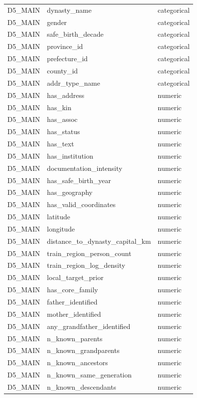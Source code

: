 \begin{longtable}{lll}
D5\_MAIN & dynasty\_name & categorical \\
D5\_MAIN & gender & categorical \\
D5\_MAIN & safe\_birth\_decade & categorical \\
D5\_MAIN & province\_id & categorical \\
D5\_MAIN & prefecture\_id & categorical \\
D5\_MAIN & county\_id & categorical \\
D5\_MAIN & addr\_type\_name & categorical \\
D5\_MAIN & has\_address & numeric \\
D5\_MAIN & has\_kin & numeric \\
D5\_MAIN & has\_assoc & numeric \\
D5\_MAIN & has\_status & numeric \\
D5\_MAIN & has\_text & numeric \\
D5\_MAIN & has\_institution & numeric \\
D5\_MAIN & documentation\_intensity & numeric \\
D5\_MAIN & has\_safe\_birth\_year & numeric \\
D5\_MAIN & has\_geography & numeric \\
D5\_MAIN & has\_valid\_coordinates & numeric \\
D5\_MAIN & latitude & numeric \\
D5\_MAIN & longitude & numeric \\
D5\_MAIN & distance\_to\_dynasty\_capital\_km & numeric \\
D5\_MAIN & train\_region\_person\_count & numeric \\
D5\_MAIN & train\_region\_log\_density & numeric \\
D5\_MAIN & local\_target\_prior & numeric \\
D5\_MAIN & has\_core\_family & numeric \\
D5\_MAIN & father\_identified & numeric \\
D5\_MAIN & mother\_identified & numeric \\
D5\_MAIN & any\_grandfather\_identified & numeric \\
D5\_MAIN & n\_known\_parents & numeric \\
D5\_MAIN & n\_known\_grandparents & numeric \\
D5\_MAIN & n\_known\_ancestors & numeric \\
D5\_MAIN & n\_known\_same\_generation & numeric \\
D5\_MAIN & n\_known\_descendants & numeric \\

\end{longtable}
